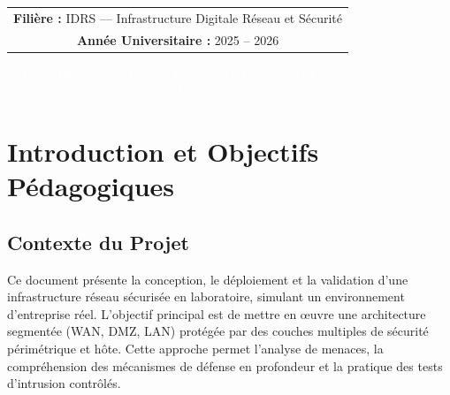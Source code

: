 \documentclass[12pt,a4paper,openany]{report}
\newif\ifshowpagenumbers
\newcommand{\hidepagenumbers}{\showpagenumbersfalse\pagestyle{empty}}
\newcommand{\showpagenumbers}{\showpagenumberstrue\pagestyle{fancy}}
\begin{document}
\begin{titlepage}
{\begin{tabular}{c}
				\textbf{\color{primary}Filière :} IDRS --- Infrastructure Digitale Réseau et Sécurité \\[0.3cm]
				\textbf{\color{primary}Année Universitaire :} 2025 -- 2026 \\
			\end{tabular}
		}
		
		\vfill
		
		\noindent
		\colorbox{primary}{%
			\parbox{\dimexpr\textwidth-2\fboxsep}{%
				\vspace{0.35cm}
				\centering
				{\small\textcolor{white}{%
						VMware Workstation 17 Pro
						\quad\textbullet\quad pfSense 2.8.0
						\quad\textbullet\quad Ubuntu 25.04}}\\[0.2cm]
				{\small\textcolor{white}{%
						Parrot Security OS
						\quad\textbullet\quad Windows XP Professional}}\\[0.35cm]
			}%
		}%
	\end{titlepage}
		
	\hidepagenumbers
	
	\tableofcontents
	\newpage
	\listoffigures
	\listoftables
	\newpage
	
	\cleardoublepage
	\showpagenumbers
	\setcounter{page}{1}
	

	\chapter{Introduction et Objectifs Pédagogiques}
	
	\section{Contexte du Projet}
	Ce document présente la conception, le déploiement et la validation d'une infrastructure réseau sécurisée en laboratoire, simulant un environnement d'entreprise réel. L'objectif principal est de mettre en œuvre une architecture segmentée (WAN, DMZ, LAN) protégée par des couches multiples de sécurité périmétrique et hôte. Cette approche permet l'analyse de menaces, la compréhension des mécanismes de défense en profondeur et la pratique des tests d'intrusion contrôlés.
	
\end{document}
